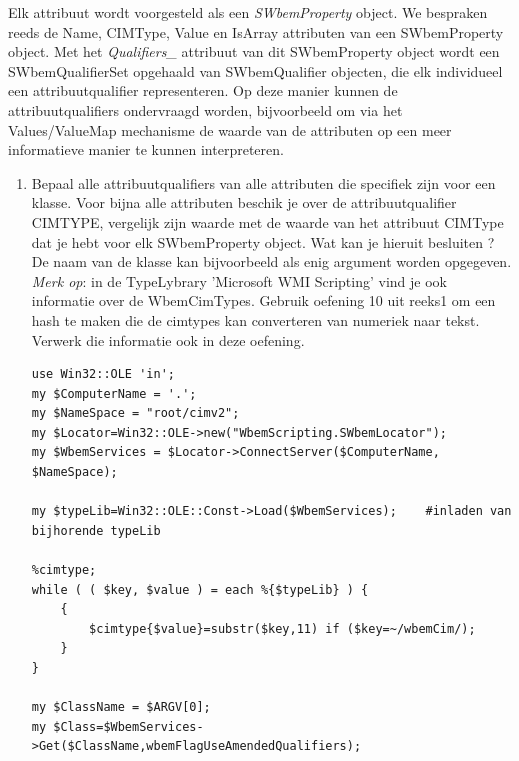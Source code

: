 \documentclass[11pt,a4paper]{report}
\begin{document}
Elk attribuut wordt voorgesteld als een \textit{SWbemProperty} object. We bespraken reeds de Name, CIMType, Value en IsArray attributen van een SWbemProperty object. Met het \textit{Qualifiers\_} attribuut van dit SWbemProperty object wordt een SWbemQualifierSet opgehaald van SWbemQualifier objecten, die elk individueel een attribuutqualifier representeren. Op deze manier kunnen de attribuutqualifiers ondervraagd worden, bijvoorbeeld om via het Values/ValueMap mechanisme de waarde van de attributen op een meer informatieve manier te kunnen interpreteren.
\begin{enumerate}[resume]
	\item Bepaal alle attribuutqualifiers van alle attributen die specifiek zijn voor een klasse. Voor bijna alle attributen beschik je over de attribuutqualifier CIMTYPE, vergelijk zijn waarde met de waarde van het attribuut CIMType dat je hebt voor elk SWbemProperty object. Wat kan je hieruit besluiten ?
	\\De naam van de klasse kan bijvoorbeeld als enig argument worden opgegeven.
	\\\textit{Merk op}: in de TypeLybrary 'Microsoft WMI Scripting' vind je ook informatie over de WbemCimTypes. Gebruik oefening 10 uit reeks1 om een hash te maken die de cimtypes kan converteren van numeriek naar tekst. Verwerk die informatie ook in deze oefening.
	\newpage
	\begin{lstlisting}
use Win32::OLE 'in';
my $ComputerName = '.';
my $NameSpace = "root/cimv2";
my $Locator=Win32::OLE->new("WbemScripting.SWbemLocator");
my $WbemServices = $Locator->ConnectServer($ComputerName, $NameSpace);

my $typeLib=Win32::OLE::Const->Load($WbemServices);    #inladen van bijhorende typeLib

%cimtype;
while ( ( $key, $value ) = each %{$typeLib} ) {
	{
		$cimtype{$value}=substr($key,11) if ($key=~/wbemCim/);
	}
}

my $ClassName = $ARGV[0]; 
my $Class=$WbemServices->Get($ClassName,wbemFlagUseAmendedQualifiers);


\end{lstlisting}
\end{enumerate}
\end{document}
